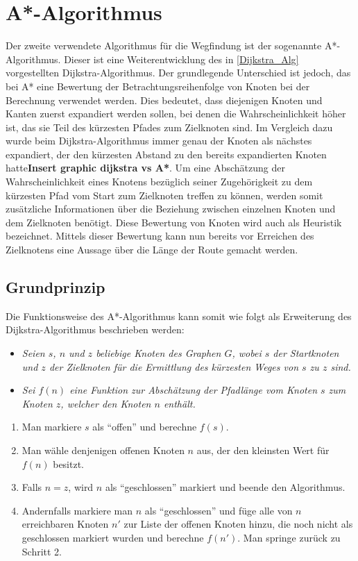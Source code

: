 \section{A*-Algorithmus}
	Der zweite verwendete Algorithmus für die Wegfindung ist der sogenannte A*-Algorithmus. Dieser ist eine Weiterentwicklung des in \ref{Dijkstra_Alg} vorgestellten Dijkstra-Algorithmus. Der grundlegende Unterschied ist jedoch, das bei A* eine Bewertung der Betrachtungsreihenfolge von Knoten bei der Berechnung verwendet werden. Dies bedeutet, dass diejenigen Knoten und Kanten zuerst expandiert werden sollen, bei denen die Wahrscheinlichkeit höher ist, das sie Teil des kürzesten Pfades zum Zielknoten sind. Im Vergleich dazu wurde beim Dijkstra-Algorithmus immer genau der Knoten als nächstes expandiert, der den kürzesten Abstand zu den bereits expandierten Knoten hatte\textbf{Insert graphic dijkstra vs A*}. Um eine Abschätzung der Wahrscheinlichkeit eines Knotens bezüglich seiner Zugehörigkeit zu dem  kürzesten Pfad vom Start zum Zielknoten treffen zu können, werden somit zusätzliche Informationen über die Beziehung zwischen einzelnen Knoten und dem Zielknoten benötigt. Diese Bewertung von Knoten wird auch als Heuristik bezeichnet. Mittels dieser Bewertung kann nun bereits vor Erreichen des Zielknotens eine Aussage über die Länge der Route gemacht werden.
	\subsection{Grundprinzip}
		\label{A*-Alg}
		Die Funktionsweise des A*-Algorithmus kann somit wie folgt als Erweiterung des Dijkstra-Algorithmus beschrieben werden\cite{Hart1968}:
		\begin{center}
			\begin{minipage}{0.8\linewidth}
				\begin{itemize}
					\item \textit{Seien $s$, $n$ und $z$ beliebige Knoten des Graphen $G$, wobei $s$ der Startknoten und $z$ der Zielknoten für die Ermittlung des kürzesten Weges von $s$ zu $z$ sind.}\\
					\item \textit{Sei $f(n)$ eine Funktion zur Abschätzung der Pfadlänge vom Knoten $s$ zum Knoten $z$, welcher den Knoten $n$ enthält.}
				\end{itemize}
		
				\begin{enumerate}
					\item Man markiere $s$ als "`offen"' und berechne $f(s)$.
					\item Man wähle denjenigen offenen Knoten $n$ aus, der den  kleinsten Wert für $f(n)$ besitzt.
					\item Falls $n=z$, wird $n$ als "`geschlossen"' markiert und beende den Algorithmus.
					\item Andernfalls markiere man $n$ als "`geschlossen"' und füge alle von $n$ erreichbaren Knoten $n'$ zur Liste der offenen Knoten hinzu, die noch nicht als geschlossen markiert wurden und berechne $f(n')$. 	Man springe zurück zu Schritt 2.
				\end{enumerate}
			\end{minipage}
		\end{center}
		
